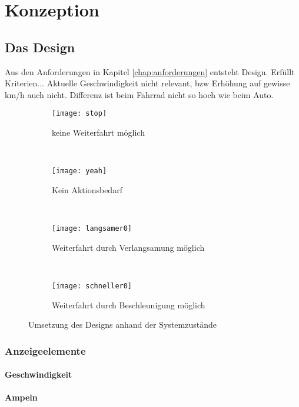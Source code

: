 \chapter{\label{chap:entwurf}Konzeption}
\section{Das Design}
Aus den Anforderungen in Kapitel \ref{chap:anforderungen} entsteht Design. Erfüllt Kriterien... Aktuelle Geschwindigkeit nicht relevant, bzw Erhöhung auf gewisse km/h auch nicht. Differenz ist beim Fahrrad nicht so hoch wie beim Auto.
\begin{figure}[H]
        \centering
           \begin{subfigure}[t]{0.23\textwidth}
                \texttt{[image: stop]}
                \caption[Systemzustand d]{keine Weiterfahrt möglich}
                \label{fig:stop}
        \end{subfigure}
           ~ 
              \begin{subfigure}[t]{0.23\textwidth}
                \texttt{[image: yeah]}
                \caption[Systemzustand c]{Kein Aktionsbedarf}
                \label{fig:yeah}
        \end{subfigure}
           ~
        \begin{subfigure}[t]{0.23\textwidth}
                \texttt{[image: langsamer0]}
                \caption[Systemzustand a]{Weiterfahrt durch Verlangsamung  möglich}
                \label{fig:langsamer}
        \end{subfigure}
        ~
        \begin{subfigure}[t]{0.23\textwidth}
                \texttt{[image: schneller0]}
                \caption[Systemzustand b]{Weiterfahrt durch Beschleunigung möglich}
                \label{fig:schneller}
        \end{subfigure}     
        \caption[Systemzustände im Ampelbereich]{Umsetzung des Designs anhand der Systemzustände}
        \label{fig:mockup}
\end{figure} 
\subsection{Anzeigeelemente}
\subsubsection{Geschwindigkeit}
\subsubsection{Ampeln}
